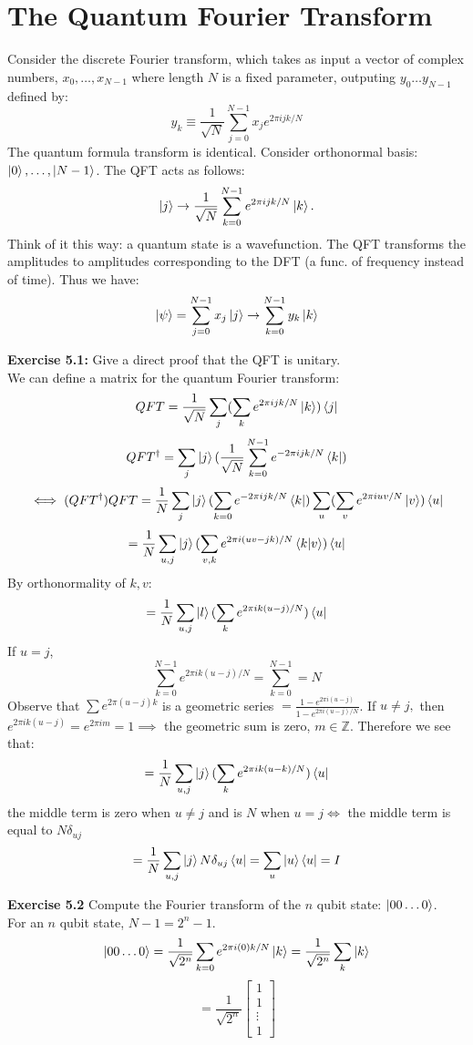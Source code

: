 \documentclass{article}
\begin{document}
\section{The Quantum Fourier Transform}
Consider the discrete Fourier transform, which takes as input a vector of complex numbers, $x_0, \dots, x_{N-1}$ where length $N$ is a fixed parameter, outputing $y_0 \dots y_{N-1}$ defined by:
$$y_k \equiv \frac{1}{\sqrt{N}} \sum^{N-1}_{j=0} x_j e^{2\pi ijk/N}$$
The quantum formula transform is identical. Consider orthonormal basis: $\ket0, \dots, \ket{N-1}$. The QFT acts as follows:
$$\ket{j}\to \frac{1}{\sqrt{N}} \sum^{N-1}_{k=0} e^{2\pi i jk/ N} \ket{k}.$$
Think of it this way: a quantum state is a wavefunction. The QFT transforms the amplitudes to amplitudes corresponding to the DFT (a func. of frequency instead of time). Thus we have:
$$\ket{\psi} = \sum^{N-1}_{j=0} x_j \ket{j} \to \sum^{N-1}_{k=0} y_k \ket{k}$$
\begin{tcolorbox}\textbf{Exercise 5.1:} Give a direct proof that the QFT is unitary.\\
	We can define a matrix for the quantum Fourier transform:
	$$QFT = \frac{1}{\sqrt N}\sum_j (\sum_{k} e^{2\pi i jk/N} \ket{k})\bra{j}$$
	$$QFT^\dag = \sum_j \ket{j} (\frac{1}{\sqrt{N}} \sum^{N-1}_{k=0} e^{-2\pi ijk/N}\bra{k}) $$
	$$\iff (QFT^\dag)QFT = \frac{1}{N} \sum_j \ket{j} (\sum_{k=0} e^{-2\pi ijk/N}\bra{k}) \sum_u (\sum_{v} e^{2\pi i u v/N} \ket{v})\bra{u} $$
	$$=\frac{1}{N}\sum_{u,j} \ket{j}(\sum_{v,k} e^{2\pi i(uv - jk)/N}\braket{k|v})\bra{u}$$
	By orthonormality of $k,v$:
	$$=\frac{1}{N}\sum_{u,j} \ket{l}(\sum_{k} e^{2\pi ik(u - j)/N})\bra{u}$$
	If $u = j$, $$\sum^{N-1}_{k=0} e^{2\pi ik(u - j)/N}  = \sum^{N-1}_{k=0} = N$$
	Observe that $\sum e^{2\pi(u-j)k}$ is a geometric series $ = \frac{1-e^{2 \pi i(u-j)}}{1-e^{2\pi i(u-j)/N}}$. If $u \neq j,$ then $e^{2\pi i k(u-j)}= e^{2 \pi i m}= 1 \implies$ the geometric sum is zero, $m \in \mathbb{Z}$.  
Therefore we see that:
$$=\frac{1}{N}\sum_{u,j} \ket{j}(\sum_{k} e^{2\pi ik(u - k)/N})\bra{u}$$
the middle term is zero when $u\neq j$ and is $N$ when $u = j \iff$ the middle term is equal to $N\delta_{uj}$
$$=\frac{1}{N}\sum_{u,j} \ket{j} N\delta_{uj} \bra{u} = \sum_u \ket{u}\bra{u} = I$$


\end{tcolorbox}
\begin{tcolorbox}\textbf{Exercise 5.2} Compute the Fourier transform of the $n$ qubit state: $\ket{00\dots0}$.\\
	For an $n$ qubit state, $N-1 = 2^n - 1$. 
	$$\ket{00\dots0} = \frac{1}{\sqrt{2^n}} \sum_{k=0} e^{2\pi i (0) k/ N} \ket{k} = \frac{1}{\sqrt{2^n}}\sum_k \ket{k}$$
	$$=\frac{1}{\sqrt{2^n}} \begin{bmatrix}1\\1\\ \vdots \\ 1\end{bmatrix}$$
\end{tcolorbox}
\end{document}
